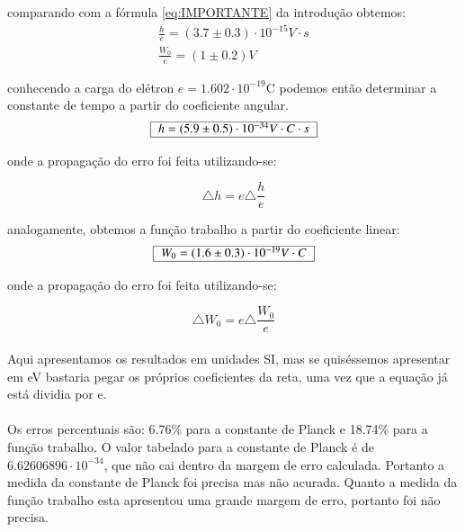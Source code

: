 \documentclass[a4paper,11pt]{article}
\begin{document}
\begin{equation}
  
  \label{eq:FitB}
\end{equation}

comparando com a fórmula \ref{eq:IMPORTANTE} da introdução
obtemos:
\begin{displaymath}
  \begin{array}{l}
    \frac{h}{e} = (3.7 \pm 0.3)\cdot 10^{-15}V\cdot s \\
    \frac{W_0}{e} = (1\pm0.2)V
    \end{array}
\end{displaymath}

conhecendo a carga do elétron $e = 1.602 \cdot
10^{-19}$C podemos então determinar a constante de tempo
a partir do coeficiente angular.
\begin{equation}
  \MyBox{$h = (5.9\pm 0.5) \cdot 10^{-34}V \cdot C \cdot s $}
\end{equation}

onde a propagação do erro foi feita utilizando-se:

\begin{equation}
  \triangle h = e\triangle \frac{h}{e}
\end{equation}

analogamente, obtemos a função trabalho a partir do
coeficiente linear:
\begin{equation}
  \MyBox{$W_0 = (1.6\pm 0.3) \cdot 10^{-19}V \cdot C$}
\end{equation}

onde a propagação do erro foi feita utilizando-se:

\begin{equation}
  \triangle W_0 = e\triangle \frac{W_0}{e}
\end{equation}

\paragraph{}Aqui apresentamos os resultados em unidades SI,
mas se quiséssemos apresentar em eV bastaria pegar os
próprios coeficientes da reta, uma vez que a equação já está
dividia por e.

\paragraph{}Os erros percentuais são: 6.76\% para a
constante de Planck e 18.74\% para a função trabalho.
O valor tabelado para a constante de Planck é de $6.62606896
\cdot 10^{-34}$, que não cai dentro da margem de erro
calculada. Portanto a medida da constante de Planck foi
precisa mas não acurada. Quanto a medida da função trabalho
esta apresentou uma grande margem de erro, portanto foi não
precisa.
\end{document}
